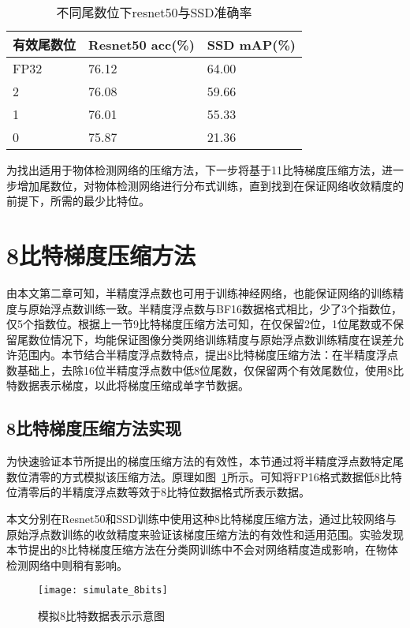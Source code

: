 \begin{table}[htb]
\centering
\noindent\begin{minipage}{0.6\textwidth}
\centering
\caption{不同尾数位下resnet50与SSD准确率}
\label{tab:simulate_11_10_9bits_acc}
\begin{tabular}{p{2cm}p{2.5cm}p{2.5cm}}
\toprule[1.5pt]
有效尾数位 & Resnet50 acc(\%) & SSD mAP(\%) \\\midrule[1pt]
FP32 & 76.12 & 64.00 \\
2 & 76.08 & 59.66 \\
1 & 76.01 & 55.33 \\
0 & 75.87 & 21.36 \\
\midrule[1pt]
\end{tabular}
\end{minipage}
\end{table}
为找出适用于物体检测网络的压缩方法，下一步将基于11比特梯度压缩方法，进一步增加尾数位，对物体检测网络进行分布式训练，直到找到在保证网络收敛精度的前提下，所需的最少比特位。

\section{8比特梯度压缩方法}
由本文第二章可知，半精度浮点数也可用于训练神经网络，也能保证网络的训练精度与原始浮点数训练一致。半精度浮点数与BF16数据格式相比，少了3个指数位，仅5个指数位。根据上一节9比特梯度压缩方法可知，在仅保留2位，1位尾数或不保留尾数位情况下，均能保证图像分类网络训练精度与原始浮点数训练精度在误差允许范围内。本节结合半精度浮点数特点，提出8比特梯度压缩方法：在半精度浮点数基础上，去除16位半精度浮点数中低8位尾数，仅保留两个有效尾数位，使用8比特数据表示梯度，以此将梯度压缩成单字节数据。
\subsection{8比特梯度压缩方法实现}
为快速验证本节所提出的梯度压缩方法的有效性，本节通过将半精度浮点数特定尾数位清零的方式模拟该压缩方法。原理如图~\ref{fig:simulate_8bits}所示。可知将FP16格式数据低8比特位清零后的半精度浮点数等效于8比特位数据格式所表示数据。

本文分别在Resnet50和SSD训练中使用这种8比特梯度压缩方法，通过比较网络与原始浮点数训练的收敛精度来验证该梯度压缩方法的有效性和适用范围。实验发现本节提出的8比特梯度压缩方法在分类网训练中不会对网络精度造成影响，在物体检测网络中则稍有影响。
\begin{figure}[htp]
\centering
\texttt{[image: simulate\_8bits]}
\caption{模拟8比特数据表示示意图}
\label{fig:simulate_8bits}
\end{figure}

